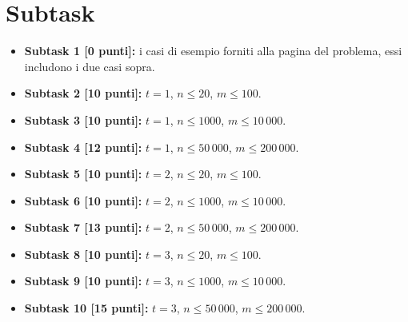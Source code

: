 \vspace{0.5cm}


\section*{Subtask}

  \begin{itemize}
    \item \textbf{Subtask 1 [0 punti]:} i casi di esempio forniti alla pagina del problema, essi includono i due casi sopra.
    \item \textbf{Subtask 2 [10 punti]:} $t=1$, $n \le 20$, $m \le 100$.
    \item \textbf{Subtask 3 [10 punti]:} $t=1$, $n \le 1000$, $m \le 10\,000$.
    \item \textbf{Subtask 4 [12 punti]:} $t=1$, $n \le 50\,000$, $m \le 200\,000$.
    \item \textbf{Subtask 5 [10 punti]:} $t=2$, $n \le 20$, $m \le 100$.
    \item \textbf{Subtask 6 [10 punti]:} $t=2$, $n \le 1000$, $m \le 10\,000$.
    \item \textbf{Subtask 7 [13 punti]:} $t=2$, $n \le 50\,000$, $m \le 200\,000$.
    \item \textbf{Subtask 8 [10 punti]:} $t=3$, $n \le 20$, $m \le 100$.
    \item \textbf{Subtask 9 [10 punti]:} $t=3$, $n \le 1000$, $m \le 10\,000$.
    \item \textbf{Subtask 10 [15 punti]:} $t=3$, $n \le 50\,000$, $m \le 200\,000$.
  \end{itemize}
  
